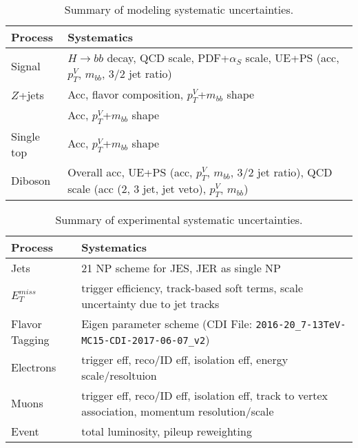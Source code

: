 \begin{table}[!htbp]\captionsetup{justification=centering}
  \begin{center}
    \begin{tabular}{lp{5in}}
      \hline\hline
      Process & Systematics\\
      \hline
      Signal  & $H\to bb$ decay, QCD scale, PDF+$\alpha_S$ scale, UE+PS (acc, $p_T^V$, $m_{bb}$, 3/2 jet ratio)\\
      $Z$+jets  & Acc, flavor composition, $p_T^V$+$m_{bb}$ shape\\
      \tt  & Acc, $p_T^V$+$m_{bb}$ shape\\
      Single top  & Acc, $p_T^V$+$m_{bb}$ shape\\
      Diboson  &  Overall acc, UE+PS (acc, $p_T^V$, $m_{bb}$, 3/2 jet ratio), QCD scale  (acc (2, 3 jet, jet veto), $p_T^V$, $m_{bb}$)\\
      \hline\hline
    \end{tabular}
  \end{center}
  \caption{Summary of modeling systematic uncertainties.}
  \label{tab:modelsys}
\end{table}

\begin{table}[!htbp]\captionsetup{justification=centering}
  \begin{center}
    \begin{tabular}{lp{5in}}
      \hline\hline
      Process & Systematics\\
      \hline
      Jets  & 21 NP scheme for JES, JER as single NP\\
      $E_T^{miss}$  & trigger efficiency, track-based soft terms, scale uncertainty due to jet tracks\\
      Flavor Tagging  & Eigen parameter scheme (CDI File: \texttt{2016-20\_7-13TeV-MC15-CDI-2017-06-07\_v2}) \\
      Electrons & trigger eff, reco/ID eff, isolation eff, energy scale/resoltuion\\
      Muons  & trigger eff, reco/ID eff, isolation eff, track to vertex association, momentum resolution/scale\\
      Event & total luminosity, pileup reweighting\\
      \hline\hline
    \end{tabular}
  \end{center}
  \caption{Summary of experimental systematic uncertainties.}
  \label{tab:expsys}
\end{table}

